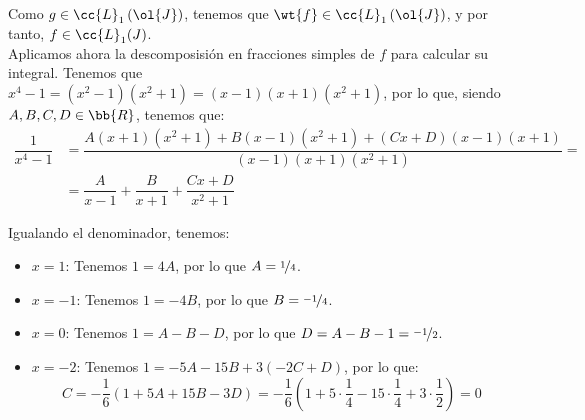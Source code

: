 \begin{ejercicio}
\begin{enumerate}
        Como $g\in \cc{L}_1\left(\ol{J}\right)$, tenemos que $\wt{f}\in \cc{L}_1\left(\ol{J}\right)$, y por tanto, $f\in \cc{L}_1(J)$.\\

        Aplicamos ahora la descomposisión en fracciones simples de $f$ para calcular su integral.
        Tenemos que $x^4-1=(x^2-1)(x^2+1)=(x-1)(x+1)(x^2+1)$, por lo que, siendo $A,B,C,D\in \bb{R}$, tenemos que:
        \begin{align*}
            \dfrac{1}{x^4-1}
            &= \dfrac{A(x+1)(x^2+1) + B(x-1)(x^2+1) + (Cx+D)(x-1)(x+1)}{(x-1)(x+1)(x^2+1)}
            =\\&= \dfrac{A}{x-1} + \dfrac{B}{x+1} + \dfrac{Cx+D}{x^2+1}
        \end{align*}

        Igualando el denominador, tenemos:
        \begin{itemize}
            \item \ul{$x=1$}: Tenemos $1=4A$, por lo que $A=\nicefrac{1}{4}$.
            \item \ul{$x=-1$}: Tenemos $1=-4B$, por lo que $B=\nicefrac{-1}{4}$.
            \item \ul{$x=0$}: Tenemos $1=A-B-D$, por lo que $D=A-B-1=\nicefrac{-1}{2}$.
            \item \ul{$x=-2$}: Tenemos $1=-5A -15B+3(-2C+D)$, por lo que:
            \begin{equation*}
                C = -\frac{1}{6}\left(1+5A+15B-3D\right)
                = -\frac{1}{6}\left(1+5\cdot \frac{1}{4}-15\cdot \frac{1}{4}+3\cdot \frac{1}{2}\right)=0
            \end{equation*}
        \end{itemize}


\end{enumerate}
\end{ejercicio}
